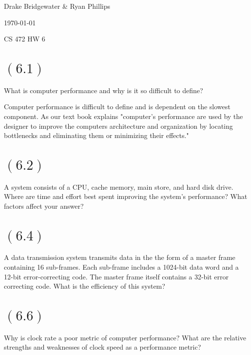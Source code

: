 \documentclass[letterpaper,12pt,titlepage]{article}
\def\name{Drake Bridgewater \& Ryan Phillips}
\begin{document}
\hfill \name

\hfill \today

\hfill CS 472 HW 6

\section*{$(6.1)$} What is computer performance and why is it so difficult to define?

\begin{mdframed}[style=MyFrame]
Computer performance is difficult to define and is dependent on the slowest component. As our text book explains "computer's performance are used by the designer to improve the computers architecture and organization by locating bottlenecks and eliminating them or minimizing their effects." \cite{Clements}
\end{mdframed}


\section*{$(6.2)$} A system consists of a CPU, cache memory, main store, and hard disk drive. Where are time and effort best spent improving the system's performance? What factors affect your answer?

\begin{mdframed}[style=MyFrame]
\end{mdframed}

\section*{$(6.4)$} A data transmission system transmits data in the the form of a master frame containing 16 sub-frames. Each sub-frame includes a 1024-bit data word and a 12-bit error-correcting code. The master frame itself contains a 32-bit error correcting code. What is the efficiency of this system?

\begin{mdframed}[style=MyFrame]
\end{mdframed}

\section*{$(6.6)$} Why is clock rate a poor metric of computer performance? What are the relative strengths and weaknesses of clock speed as a performance metric?

\begin{mdframed}[style=MyFrame]
\end{mdframed}
\end{document}
